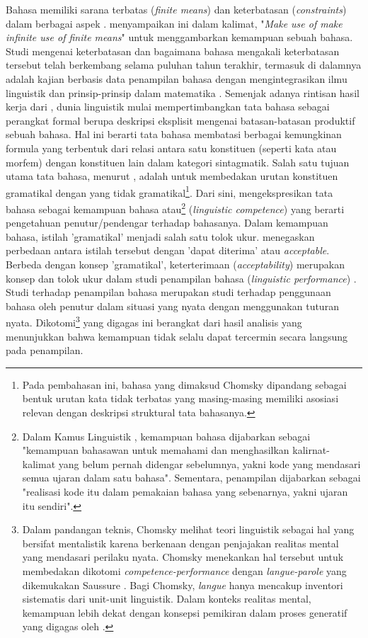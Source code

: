 Bahasa memiliki sarana terbatas (\textit{finite means}) dan keterbatasan (\textit{constraints}) dalam berbagai aspek \citep{von1972origin}. \cite{von1972origin} menyampaikan ini dalam kalimat, "\textit{Make use of make infinite use of finite means}" untuk menggambarkan kemampuan sebuah bahasa. Studi mengenai keterbatasan dan bagaimana bahasa mengakali keterbatasan tersebut telah berkembang selama puluhan tahun terakhir, termasuk di dalamnya adalah kajian berbasis data penampilan bahasa dengan mengintegrasikan ilmu linguistik dan prinsip-prinsip dalam matematika \citep{chomsky1965syntactic}. Semenjak adanya rintisan hasil kerja dari \cite{chomsky1957syntactic}, dunia linguistik mulai mempertimbangkan tata bahasa sebagai perangkat formal berupa deskripsi eksplisit mengenai batasan-batasan produktif sebuah bahasa. Hal ini berarti tata bahasa membatasi berbagai kemungkinan formula yang terbentuk dari relasi antara satu konstituen (seperti kata atau morfem) dengan konstituen lain dalam kategori sintagmatik. Salah satu tujuan utama tata bahasa, menurut \cite{chomsky1965syntactic}, adalah untuk membedakan urutan konstituen gramatikal dengan yang tidak gramatikal\footnote{Pada pembahasan ini, bahasa yang dimaksud Chomsky dipandang sebagai bentuk urutan kata tidak terbatas yang masing-masing memiliki asosiasi relevan dengan deskripsi struktural tata bahasanya.}. Dari sini, \cite{chomsky1965syntactic} mengekspresikan tata bahasa sebagai kemampuan bahasa atau\footnote{Dalam Kamus Linguistik \citep{kridalaksana2008kamus}, kemampuan bahasa dijabarkan sebagai "kemampuan bahasawan untuk memahami dan menghasilkan kalirnat-kalimat yang belum pernah didengar sebelumnya, yakni kode yang mendasari semua ujaran dalam satu bahasa". Sementara, penampilan dijabarkan sebagai "realisasi kode itu dalam pemakaian bahasa yang sebenarnya, yakni ujaran itu sendiri".} (\textit{linguistic competence}) yang berarti pengetahuan penutur/pendengar terhadap bahasanya. Dalam kemampuan bahasa, istilah 'gramatikal' menjadi salah satu tolok ukur. \cite{chomsky1965syntactic} menegaskan perbedaan antara istilah tersebut dengan 'dapat diterima' atau \textit{acceptable}.  Berbeda dengan konsep 'gramatikal', keterterimaan (\textit{acceptability}) merupakan konsep dan tolok ukur dalam studi penampilan bahasa (\textit{linguistic performance}) \citep{chomsky1965syntactic}. Studi terhadap penampilan bahasa merupakan studi terhadap penggunaan bahasa oleh penutur dalam situasi yang nyata dengan menggunakan tuturan nyata. Dikotomi\footnote{Dalam pandangan teknis, Chomsky melihat teori linguistik sebagai hal yang bersifat mentalistik karena berkenaan dengan penjajakan realitas mental yang mendasari perilaku nyata. Chomsky menekankan hal tersebut untuk membedakan dikotomi \textit{competence-performance} dengan \textit{langue-parole} yang dikemukakan Saussure \citep{key2017course}. Bagi Chomsky, \textit{langue} hanya mencakup inventori sistematis dari unit-unit linguistik. Dalam konteks realitas mental, kemampuan lebih dekat dengan konsepsi pemikiran dalam proses generatif yang digagas oleh \cite{von1972origin}.} yang digagas  \cite{chomsky1965syntactic} ini berangkat dari hasil analisis yang menunjukkan bahwa kemampuan tidak selalu dapat tercermin secara langsung pada penampilan.

